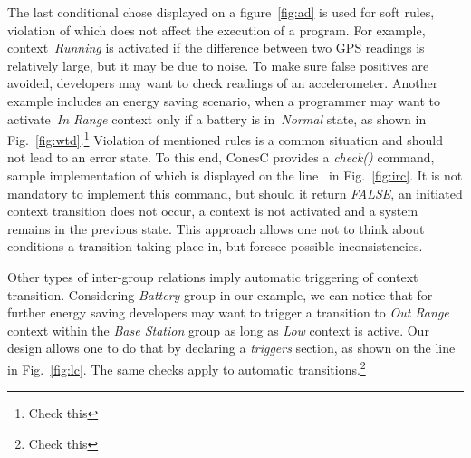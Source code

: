 The last conditional chose displayed on a figure~\ref{fig:ad} is used for soft rules, violation of
which does not affect the execution of a program. For example, context~\emph{Running} is
activated if the difference between two GPS readings is relatively large, but it may be due to noise.
To make sure false positives are avoided, developers may want to check
readings of an accelerometer. Another example includes an energy saving scenario,
when a programmer may want to activate~\emph{In Range} context only if a battery is
in~\emph{Normal} state, as shown in Fig.~\ref{fig:wtd}.\footnote{Check this}
Violation of mentioned rules is a common situation and should not lead to an error state.
To this end, ConesC provides a \emph{check()} command, sample implementation of which is
displayed on the line~ in Fig.~\ref{fig:irc}. It is not mandatory to implement this
command, but should it return \emph{FALSE}, an initiated context transition does not occur,
a context is not activated and a system remains in the previous state.
This approach allows one not to think about conditions a transition taking
place in, but foresee possible inconsistencies.


Other types of inter-group relations imply automatic triggering of context
transition. Considering \emph{Battery} group in our example, we can notice that
for further energy saving developers may want to trigger a transition to
\emph{Out Range} context within the \emph{Base Station} group as long as
\emph{Low} context is active. Our design allows one to do that by declaring a
\emph{triggers} section, as shown on the line~ in Fig.~\ref{fig:lc}.
The same checks apply to automatic transitions.\footnote{Check this}

